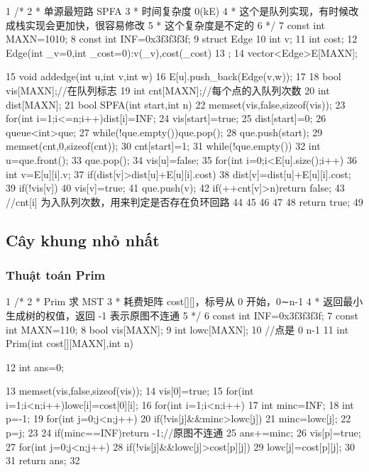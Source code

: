 \documentclass[11pt]{article}
\begin{document}
\begin{Code}
 1   /*
 2    * 单源最短路 SPFA
 3    * 时间复杂度 0(kE)
 4    * 这个是队列实现，有时候改成栈实现会更加快，很容易修改
 5    * 这个复杂度是不定的
 6    */
 7   const int MAXN=1010;
 8   const int INF=0x3f3f3f3f;
 9   struct Edge{
10       int v;
11       int cost;
12       Edge(int _v=0,int _cost=0):v(_v),cost(_cost){}
13   };
14   vector<Edge>E[MAXN];


15   void addedge(int u,int v,int w){
16       E[u].push_back(Edge(v,w));
17   }
18   bool vis[MAXN];//在队列标志
19   int cnt[MAXN];//每个点的入队列次数
20   int dist[MAXN];
21   bool SPFA(int start,int n){
22       memset(vis,false,sizeof(vis));
23       for(int i=1;i<=n;i++)dist[i]=INF;
24       vis[start]=true;
25       dist[start]=0;
26       queue<int>que;
27       while(!que.empty())que.pop();
28       que.push(start);
29       memset(cnt,0,sizeof(cnt));
30       cnt[start]=1;
31       while(!que.empty()){
32           int u=que.front();
33           que.pop();
34           vis[u]=false;
35           for(int i=0;i<E[u].size();i++){
36               int v=E[u][i].v;
37               if(dist[v]>dist[u]+E[u][i].cost){
38                   dist[v]=dist[u]+E[u][i].cost;
39                   if(!vis[v]){
40                        vis[v]=true;
41                        que.push(v);
42                        if(++cnt[v]>n)return false;
43                        //cnt[i] 为入队列次数，用来判定是否存在负环回路
44                   }
45               }
46           }
47       }
48       return true;
49   }
\end{Code}

\subsection{Cây khung nhỏ nhất}

\subsubsection{Thuật toán Prim}

\begin{Code}
 1   /*
 2    * Prim 求 MST
 3    * 耗费矩阵 cost[][]，标号从 0 开始，0∼n-1
 4    * 返回最小生成树的权值，返回 -1 表示原图不连通
 5    */
 6   const int INF=0x3f3f3f3f;
 7   const int MAXN=110;
 8   bool vis[MAXN];
 9   int lowc[MAXN];
10   //点是 0 n-1
11   int Prim(int cost[][MAXN],int n){
12       int ans=0;


13       memset(vis,false,sizeof(vis));
14       vis[0]=true;
15       for(int i=1;i<n;i++)lowc[i]=cost[0][i];
16       for(int i=1;i<n;i++){
17           int minc=INF;
18           int p=-1;
19           for(int j=0;j<n;j++)
20               if(!vis[j]&&minc>lowc[j]){
21                   minc=lowc[j];
22                   p=j;
23               }
24           if(minc==INF)return -1;//原图不连通
25           ans+=minc;
26           vis[p]=true;
27           for(int j=0;j<n;j++)
28               if(!vis[j]&&lowc[j]>cost[p][j])
29                   lowc[j]=cost[p][j];
30       }
31       return ans;
32 }
\end{Code}
\end{document}
